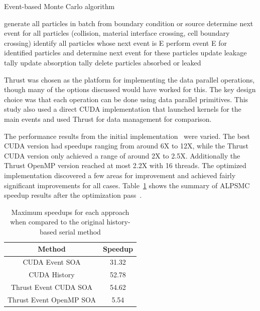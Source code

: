 \begin{algorithm}
\DontPrintSemicolon
\caption{Event-based Monte Carlo algorithm}
\label{alg:eventbased}
{ 
    generate all particles in batch from boundary condition or source\;
    determine next event for all particles (collision, material interface crossing, cell boundary crossing)\;
    {
       {
          identify all particles whose next event is E\;
          perform event E for identified particles and determine next event for these particles\;
       }
       {
          update leakage tally\;
       }
       {
          update absorption tally\;
       }
       delete particles absorbed or leaked\;
    }
}
\end{algorithm}

Thrust was chosen as the platform for implementing the data parallel operations, though many of the options discussed would have worked for this.
%
The key design choice was that each operation can be done using data parallel primitives.
%
This study also used a direct CUDA implementation that launched kernels for the main events and used Thrust for data management for comparison.

The performance results from the initial implementation~\cite{alpsmc1} were varied.
The best CUDA version had speedups ranging from around 6X to 12X, while the Thrust CUDA version only achieved a range of around 2X to 2.5X.
%
Additionally the Thrust OpenMP version reached at most 2.2X with 16 threads.
%
The optimized implementation discovered a few areas for improvement and achieved fairly significant improvements for all cases.
%
Table~\ref{tab:ALPSspeedup} shows the summary of ALPSMC speedup results after the optimization pass~\cite{alpsmc2}.
%

\begin{table}
\caption { Maximum speedups for each approach when compared to the original history-based serial method } \label{tab:ALPSspeedup} 
\begin{center}
\begin{tabular}{ |c|c|}
\hline
Method & Speedup\\
\hline
CUDA Event SOA & 31.32\\
\hline
CUDA History & 52.78\\
\hline
Thrust Event CUDA SOA & 54.62\\
\hline
Thrust Event OpenMP SOA & 5.54\\
\hline
\end{tabular}
\end{center}
\end{table}

